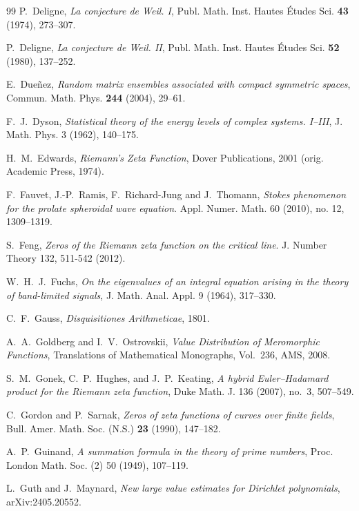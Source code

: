 \documentclass{article}
\begin{document}
\begin{thebibliography}{99}
P.~Deligne, 
\emph{La conjecture de Weil. I}, 
Publ. Math. Inst. Hautes Études Sci. \textbf{43} (1974), 273--307.

P.~Deligne, 
\emph{La conjecture de Weil. II}, 
Publ. Math. Inst. Hautes Études Sci. \textbf{52} (1980), 137--252.

E.~Dueñez, 
\emph{Random matrix ensembles associated with compact symmetric spaces}, 
Commun. Math. Phys. \textbf{244} (2004), 29--61.

F.~J.~Dyson, 
\emph{Statistical theory of the energy levels of complex systems. I--III}, 
J. Math. Phys. 3 (1962), 140--175.

H.~M.~Edwards, 
\emph{Riemann's Zeta Function}, 
Dover Publications, 2001 (orig. Academic Press, 1974).

  F.~Fauvet, J.-P.~Ramis, F.~Richard-Jung and J.~Thomann,  \emph{ Stokes phenomenon for the prolate spheroidal wave equation}. Appl. Numer. Math. 60 (2010), no. 12, 1309--1319.

 S.~Feng, \emph{Zeros of the Riemann zeta function on the critical line}. J. Number Theory 132, 511-542 (2012).

W.~H.~J.~Fuchs, 
\emph{On the eigenvalues of an integral equation arising in the theory of band-limited signals}, 
J. Math. Anal. Appl. 9 (1964), 317--330.

C.~F.~Gauss, 
\emph{Disquisitiones Arithmeticae}, 1801.

A.~A.~Goldberg and I.~V.~Ostrovskii, 
\emph{Value Distribution of Meromorphic Functions}, 
Translations of Mathematical Monographs, Vol.~236, AMS, 2008.

S.~M.~Gonek, C.~P.~Hughes, and J.~P.~Keating, 
\emph{A hybrid Euler--Hadamard product for the Riemann zeta function}, 
Duke Math. J. 136 (2007), no.~3, 507--549.

C.~Gordon and P.~Sarnak, 
\emph{Zeros of zeta functions of curves over finite fields}, 
Bull. Amer. Math. Soc. (N.S.) \textbf{23} (1990), 147--182.

A.~P.~Guinand, 
\emph{A summation formula in the theory of prime numbers}, 
Proc. London Math. Soc. (2) 50 (1949), 107--119.

 L.~Guth and J.~Maynard, \emph{ New large value estimates for Dirichlet polynomials}, arXiv:2405.20552.


\end{thebibliography}
\end{document}
